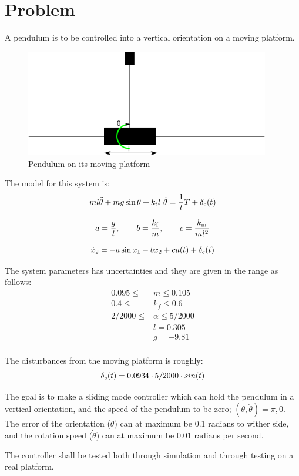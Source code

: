 \chapter{Problem}
A pendulum is to be controlled into a vertical orientation on a moving platform.
\begin{figure}[htbp]
        \centering
        \includegraphics[width=0.95\textwidth]{pendul.png}
        \caption{Pendulum on its moving platform}
        \label{fig:problem}
\end{figure}
The model for this system is:
\begin{equation}
        m l \Ddot{\theta} + m g \sin\theta + k_{\mathrm{f}}  l \ \dot{\theta} = \frac{1}{l}T + \delta_{\mathrm{c}}(t)
\end{equation}

\begin{equation}
        a=\frac{g}{l}, \qquad b=\frac{k_{\mathrm{f}}}{m}, \qquad c= \frac{k_{\mathrm{m}}}{m l^2}
\end{equation}

\begin{equation}
        \dot{x}_2 = - a \sin x_1 - b x_2 + c u(t) + \delta_{\mathrm{c}}(t)
\end{equation}

The system parameters has uncertainties and they are given in the range as follows:
\begin{equation}
        \begin{split}
                0.095 \leq &m \leq 0.105 \\
                0.4 \leq &k_f \leq 0.6 \\
                2/2000 \leq &\alpha \leq 5/2000 \\
                &l = 0.305 \\
                &g = -9.81 \\
        \end{split}
\end{equation}

The disturbances from the moving platform is roughly:
\begin{equation}
        \delta_c(t) = 0.0934 \cdot 5/2000 \cdot sin(t)
\end{equation}

The goal is to make a sliding mode controller which can hold the pendulum in a vertical orientation, and the speed of the pendulum to be zero; $(\theta, \dot{\theta})= \pi, 0$. The error of the orientation ($\theta$) can at maximum be 0.1 radians to wither side, and the rotation speed ($\dot{\theta}$) can at maximum be 0.01 radians per second.

The controller shall be tested both through simulation and through testing on a real platform.